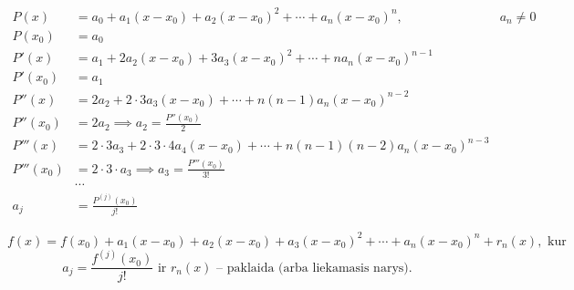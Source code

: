 \begin{align*}
  P(x) &= a_{0} + a_{1}(x - x_{0}) + a_{2}(x - x_{0})^{2} + \cdots
    + a_{n}(x - x_{0})^{n}, & a_{n} \neq 0 \\
  P(x_{0}) &= a_{0} \\
  P'(x) &= a_{1} + 2a_{2}(x - x_{0}) + 3a_{3}(x - x_{0})^{2} + \cdots
    + n a_{n}(x - x_{0})^{n-1} \\
  P'(x_{0}) &= a_{1} \\
  P''(x) &= 2 a_{2} + 2 \cdot 3 a_{3}(x - x_{0}) + \cdots 
    + n(n - 1)a_{n}(x - x_{0})^{n - 2} \\
  P''(x_{0}) &= 2 a_{2} \implies a_{2} = \frac{P''(x_{0})}{2} \\
  P'''(x) &= 2 \cdot 3 a_{3} + 2 \cdot 3 \cdot 4 a_{4} (x - x_{0}) + \cdots
    + n(n - 1)(n - 2)a_{n}(x - x_{0})^{n - 3} \\
  P'''(x_{0}) &= 2 \cdot 3 \cdot a_{3} 
    \implies a_{3} = \frac{P'''(x_{0})}{3!} \\
  &\cdots \\
  a_{j} &= \frac{P^{(j)}(x_{0})}{j!}
\end{align*}

\begin{equation}
  f(x) = f(x_{0}) + a_{1}(x - x_{0}) + a_{2}(x - x_{0}) +
    a_{3}(x - x_{0})^{2} + \cdots + a_{n} (x - x_{0})^{n} +
    r_{n}(x), \text{ kur }
  \label{teiloras}
\end{equation}
\begin{equation*}
  a_{j} = \frac{f^{(j)}(x_{0})}{j!} 
  \text{ ir }
  r_{n}(x) \text{ – paklaida (arba liekamasis narys).}
\end{equation*}


